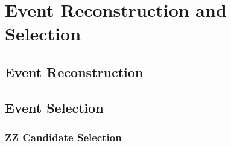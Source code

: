 \section{Event Reconstruction and Selection}
\label{sec:evt_sel}

\subsection{Event Reconstruction}


\subsection{Event Selection}

\subsubsection{ZZ Candidate Selection}
\label{subsubsec:zz_sel}